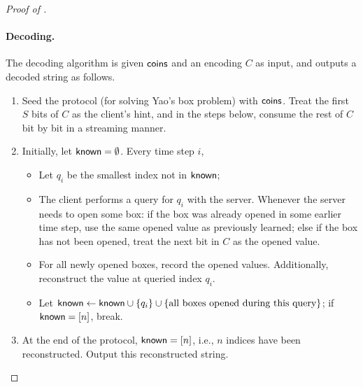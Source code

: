 \begin{proof}[Proof of ]
\paragraph{Decoding.}
The decoding algorithm is given ${\sf coins}$
and an encoding $C$ as input, and 
outputs a decoded string as follows.
\begin{enumerate}[leftmargin=6mm]
\item 
Seed the protocol (for solving Yao's box problem)
with ${\sf coins}$.  
Treat
the first $S$ bits of $C$ as the client's hint, 
and in the steps below, consume the rest of $C$ bit by bit 
in a streaming manner.
\item 
Initially, let ${\sf known}= \emptyset$.
Every time step $i$, 
\begin{itemize}[leftmargin=5mm] 
\item Let $q_i$ be the smallest
index not in ${\sf known}$; 
\item 
The client performs a query for $q_i$ with the server.
Whenever the 
server needs to open some box: if the box was already
opened in some earlier time step, use the same opened value 
as previously learned;  
else if the box has not been opened, 
treat the next bit in $C$ 
as the opened value.
\item 
For all newly opened 
boxes, record the opened values. 
Additionally, reconstruct the value at queried index $q_i$.
\item 
Let ${\sf known} \leftarrow {\sf known} 
\cup \{q_i\} \cup \{\text{all boxes opened during this query}\}$; 
if ${\sf known} = [n]$, break. 
\end{itemize}
\item 
At the end of the protocol, ${\sf known} = [n]$, i.e., 
$n$ indices
have been reconstructed. 
Output this reconstructed string.
\end{enumerate}
\end{proof}





